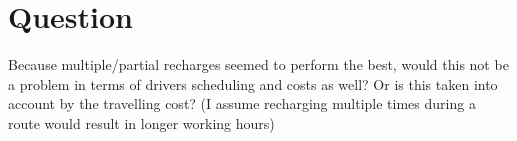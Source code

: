 \documentclass[11pt]{article}
\begin{document}
\section{Question}
Because multiple/partial recharges seemed to perform the best, would this not be a problem in terms of drivers scheduling and costs as well? Or is this taken into account by the travelling cost? (I assume recharging multiple times during a route would result in longer working hours)
\end{document}
